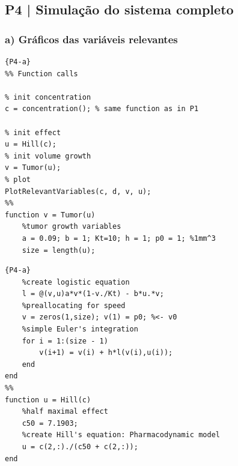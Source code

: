 \clearpage
\subsection{P4 | Simulação do sistema completo}
\label{subsec:P4}
\vspace{-0.5em}
\subsubsection{a) Gráficos das variáveis relevantes}
\label{subsubsec:P4a}

\vspace{-1em}
\noindent\begin{minipage}[t]{0.45\textwidth}
\begin{lstlisting}[title=Pergunta 4, frame=tlrb]{P4-a}
%% Function calls

% init concentration
c = concentration(); % same function as in P1

% init effect
u = Hill(c);
% init volume growth
v = Tumor(u);
% plot
PlotRelevantVariables(c, d, v, u);
%%
function v = Tumor(u)
    %tumor growth variables 
    a = 0.09; b = 1; Kt=10; h = 1; p0 = 1; %1mm^3 
    size = length(u);
\end{lstlisting}
\end{minipage}
\hfill \noindent\begin{minipage}[t]{0.45\textwidth}
\begin{lstlisting}[title = (continuação), frame=tlrb]{P4-a}
    %create logistic equation
    l = @(v,u)a*v*(1-v./Kt) - b*u.*v;
    %preallocating for speed
    v = zeros(1,size); v(1) = p0; %<- v0
    %simple Euler's integration
    for i = 1:(size - 1)
        v(i+1) = v(i) + h*l(v(i),u(i));
    end
end
%%
function u = Hill(c)
    %half maximal effect
    c50 = 7.1903;
    %create Hill's equation: Pharmacodynamic model
    u = c(2,:)./(c50 + c(2,:));
end
\end{lstlisting}
\end{minipage}

